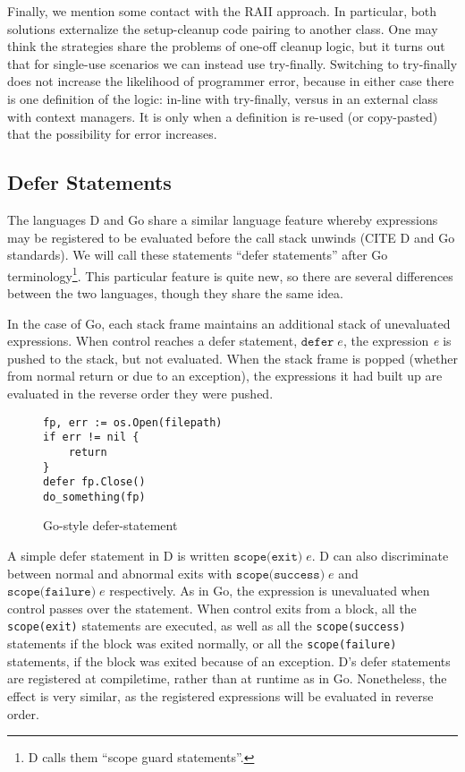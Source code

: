 \documentclass[11pt]{article}
\begin{document}
Finally, we mention some contact with the RAII approach.
In particular, both solutions externalize the setup-cleanup code pairing to another class.
One may think the strategies share the problems of one-off cleanup logic, but it turns out that for single-use scenarios we can instead use try-finally.
Switching to try-finally does not increase the likelihood of programmer error, because in either case there is one definition of the logic: in-line with try-finally, versus in an external class with context managers.
It is only when a definition is re-used (or copy-pasted) that the possibility for error increases.


\subsection{Defer Statements}
\label{defer}

The languages D and Go share a similar language feature whereby expressions may be registered to be evaluated before the call stack unwinds (CITE D and Go standards). We will call these statements ``defer statements'' after Go terminology\footnote{D calls them ``scope guard statements''.}. This particular feature is quite new, so there are several differences between the two languages, though they share the same idea.

In the case of Go, each stack frame maintains an additional stack of unevaluated expressions. When control reaches a defer statement, $\texttt{defer}\;e$, the expression \textit{e} is pushed to the stack, but not evaluated. When the stack frame is popped (whether from normal return or due to an exception), the expressions it had built up are evaluated in the reverse order they were pushed.

\begin{figure}[h]
\caption{Go-style defer-statement}
\label{goDeferStatement}
\begin{verbatim}
fp, err := os.Open(filepath)
if err != nil {
    return
}
defer fp.Close()
do_something(fp)
\end{verbatim}
\end{figure}

A simple defer statement in D is written $\texttt{scope(exit)}\;e$.
D can also discriminate between normal and abnormal exits with $\texttt{scope(success)}\;e$ and $\texttt{scope(failure)}\;e$ respectively.
As in Go, the expression is unevaluated when control passes over the statement.
When control exits from a block, all the \texttt{scope(exit)} statements are executed, as well as all the \texttt{scope(success)} statements if the block was exited normally, or all the \texttt{scope(failure)} statements, if the block was exited because of an exception.
D's defer statements are registered at compiletime, rather than at runtime as in Go.
Nonetheless, the effect is very similar, as the registered expressions will be evaluated in reverse order.
\end{document}
